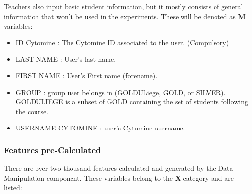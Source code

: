 \documentclass[a4paper,11pt]{report}
\numberwithin{figure}{section} %
\begin{document}
    Teachers also input basic student information, but it mostly consists of general information that won't be used in the experiments. These will be denoted as \textbf{M} variables:
   	\begin{itemize}
   	\item[\textbullet] ID Cytomine : The Cytomine ID associated to the user. (Compulsory)
    \item[\textbullet] LAST NAME : User's last name.
    \item[\textbullet] FIRST NAME : User's First name (forename).
    \item[\textbullet] GROUP : group user belongs in (GOLDULiege, GOLD, or SILVER). GOLDULIEGE is a subset of GOLD containing the set of students following the course.
    \item[\textbullet] USERNAME CYTOMINE : user's Cytomine username.
   	\end{itemize}
    
    
    \subsubsection{Features pre-Calculated}
    
    There are over two thousand features calculated and generated by the Data Manipulation component. These variables belong to the \textbf{X} category and are listed:
   
\end{document}
